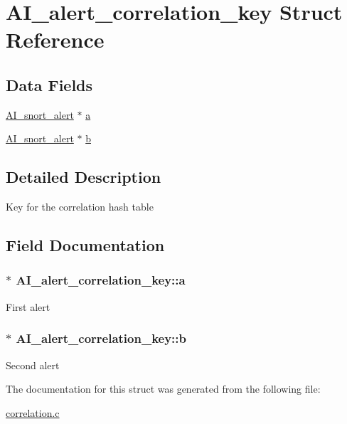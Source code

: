 \hypertarget{structAI__alert__correlation__key}{
\section{AI\_\-alert\_\-correlation\_\-key Struct Reference}
\label{structAI__alert__correlation__key}
}
\subsection*{Data Fields}
\begin{DoxyCompactItemize}
\item 
\hyperlink{struct__AI__snort__alert}{AI\_\-snort\_\-alert} $\ast$ \hyperlink{structAI__alert__correlation__key_a774daec9332da25835a0904d853acadb}{a}
\item 
\hyperlink{struct__AI__snort__alert}{AI\_\-snort\_\-alert} $\ast$ \hyperlink{structAI__alert__correlation__key_a5805dec6499a83b818091b4f21c715dc}{b}
\end{DoxyCompactItemize}


\subsection{Detailed Description}
Key for the correlation hash table 

\subsection{Field Documentation}
\hypertarget{structAI__alert__correlation__key_a774daec9332da25835a0904d853acadb}{
\subsubsection[{a}]{$\ast$ {\bf AI\_\-alert\_\-correlation\_\-key::a}}}
\label{structAI__alert__correlation__key_a774daec9332da25835a0904d853acadb}
First alert \hypertarget{structAI__alert__correlation__key_a5805dec6499a83b818091b4f21c715dc}{
\subsubsection[{b}]{$\ast$ {\bf AI\_\-alert\_\-correlation\_\-key::b}}}
\label{structAI__alert__correlation__key_a5805dec6499a83b818091b4f21c715dc}
Second alert 

The documentation for this struct was generated from the following file:\begin{DoxyCompactItemize}
\item 
\hyperlink{correlation_8c}{correlation.c}\end{DoxyCompactItemize}
